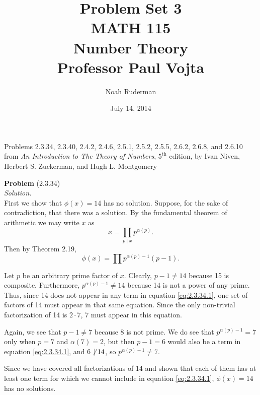 \documentclass[12 pt]{amsart}
\begin{document}
\allowdisplaybreaks
\title
[Problem Set 3]
{Problem Set 3 \\
MATH 115 \\
Number Theory \\
Professor Paul Vojta}

\author{Noah Ruderman}

\date{ July 14, 2014}

\maketitle
\begin{center}
	Problems 2.3.34, 2.3.40, 2.4.2, 2.4.6, 2.5.1, 2.5.2, 2.5.5, 2.6.2, 2.6.8, and 2.6.10 
	from \emph{An Introduction to The Theory of Numbers}, 
	$5^{\text{th}}$ edition,
	by Ivan Niven, Herbert S. Zuckerman, and Hugh L. Montgomery 
\end{center}

\newpage
\phantom{\quad} \vfill
\noindent
\textbf{Problem} (2.3.34) \\[4ex]
\emph{Solution.} \\[2ex]
  First we show that $\phi(x) = 14$ has no solution.
  Suppose, for the sake of contradiction, that there was a solution.
  By the fundamental theorem of arithmetic we may write $x$ as 
  \[
    x = \prod_{p \mid x} p^{\alpha(p)}.
  \]
  Then by Theorem 2.19, 
  \begin{equation}
    \label{eq:2.3.34.1}
    \phi(x) = \prod  p^{\alpha(p)-1}(p - 1).
  \end{equation}

  Let $p$ be an arbitrary prime factor of $x$.
  Clearly, $p-1 \neq 14$ because 15 is composite.
  Furthermore, $p^{\alpha(p)-1} \neq 14$ because 14 is not
  a power of any prime. 
  Thus, since 14 does not appear in any term in equation \ref{eq:2.3.34.1},
  one set of factors of 14 must appear in that same equation.
  Since the only non-trivial factorization of 14 is $2 \cdot 7$, 
  7 must appear in this equation.

  Again, we see that $p -1 \neq 7$ because 8 is not prime.
  We do see that $p^{\alpha(p) - 1} = 7$ only when
  $p = 7$ and $\alpha(7) = 2$, but then 
  $p -1 = 6$ would also be a term in equation \ref{eq:2.3.34.1}, 
  and $6 \not \, \mid 14$, so $p^{\alpha(p)-1} \neq 7$.

  Since we have covered all factorizations of 14 and shown that each of them
  has at least one term for which we cannot include in equation
  \ref{eq:2.3.34.1}, $\phi(x) = 14$ has no solutions.
\end{document}
